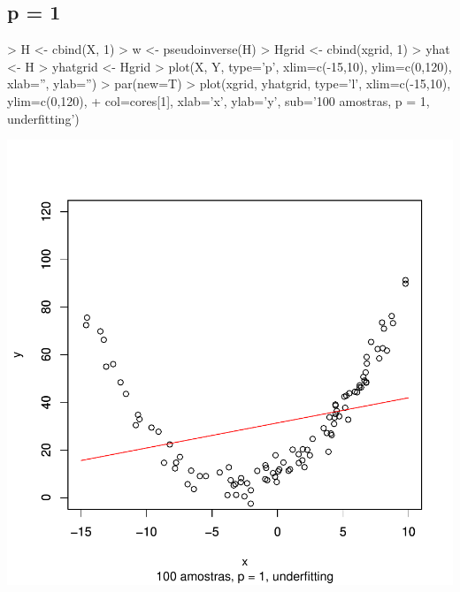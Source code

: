 \documentclass{article}
\begin{document}
\subsection{p = 1}
\begin{Schunk}
\begin{Sinput}
> H <- cbind(X, 1)
> w <- pseudoinverse(H) %
> Hgrid <- cbind(xgrid, 1)
> yhat <- H %
> yhatgrid <- Hgrid %
> plot(X, Y, type='p', xlim=c(-15,10), ylim=c(0,120), xlab='', ylab='')
> par(new=T)
> plot(xgrid, yhatgrid, type='l', xlim=c(-15,10), ylim=c(0,120), 
+      col=cores[1], xlab='x', ylab='y', sub='100 amostras, p = 1, underfitting')
\end{Sinput}
\end{Schunk}
\includegraphics{aprox-011}
\end{document}
